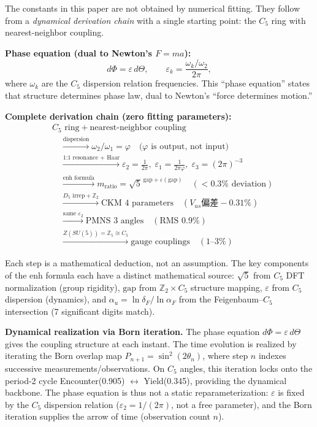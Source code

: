 \documentclass[11pt,a4paper]{article}
\begin{document}
The constants in this paper are not obtained by numerical fitting. They follow from a \emph{dynamical derivation chain} with a single starting point: the $C_5$ ring with nearest-neighbor coupling.

\textbf{Phase equation (dual to Newton's $F = ma$):}
\[
d\Phi = \varepsilon \, d\Theta, \qquad \varepsilon_k = \frac{\omega_k / \omega_2}{2\pi},
\]
where $\omega_k$ are the $C_5$ dispersion relation frequencies. This ``phase equation'' states that structure determines phase law, dual to Newton's ``force determines motion.''

\textbf{Complete derivation chain (zero fitting parameters):}
\[
\begin{aligned}
&C_5 \text{ ring} + \text{nearest-neighbor coupling} \\
&\quad \xrightarrow{\text{dispersion}} \omega_2/\omega_1 = \varphi \quad \text{($\varphi$ is output, not input)} \\
&\quad \xrightarrow{\text{1:1 resonance + Haar}} \varepsilon_2 = \tfrac{1}{2\pi},\; \varepsilon_1 = \tfrac{1}{2\pi\varphi},\; \varepsilon_3 = (2\pi)^{-3} \\
&\quad \xrightarrow{\text{enh formula}} m_\text{ratio} = \sqrt{5}^{\,\text{gap} + \varepsilon(\text{gap})} \quad (< 0.3\% \text{ deviation}) \\
&\quad \xrightarrow{D_5 \text{ irrep} + \mathbb{Z}_2} \text{CKM 4 parameters} \quad (V_{us} \text{偏差} -0.31\%) \\
&\quad \xrightarrow{\text{same } \varepsilon_2} \text{PMNS 3 angles} \quad (\text{RMS } 0.9\%) \\
&\quad \xrightarrow{Z(SU(5)) = \mathbb{Z}_5 \cong C_5} \text{gauge couplings} \quad (1\text{--}3\%)
\end{aligned}
\]

Each step is a mathematical deduction, not an assumption. The key components of the $\text{enh}$ formula each have a distinct mathematical source: $\sqrt{5}$ from $C_5$ DFT normalization (group rigidity), $\text{gap}$ from $\mathbb{Z}_2 \times C_5$ structure mapping, $\varepsilon$ from $C_5$ dispersion (dynamics), and $\alpha_u = \ln\delta_F / \ln\alpha_F$ from the Feigenbaum--$C_5$ intersection (7 significant digits match).

\textbf{Dynamical realization via Born iteration.} The phase equation $d\Phi = \varepsilon\,d\Theta$ gives the coupling structure at each instant. The time evolution is realized by iterating the Born overlap map $P_{n+1} = \sin^2(2\theta_n)$, where step $n$ indexes successive measurements/observations. On $C_5$ angles, this iteration locks onto the period-2 cycle Encounter(0.905) $\leftrightarrow$ Yield(0.345), providing the dynamical backbone. The phase equation is thus not a static reparameterization: $\varepsilon$ is fixed by the $C_5$ dispersion relation ($\varepsilon_2 = 1/(2\pi)$, not a free parameter), and the Born iteration supplies the arrow of time (observation count $n$).
\end{document}
